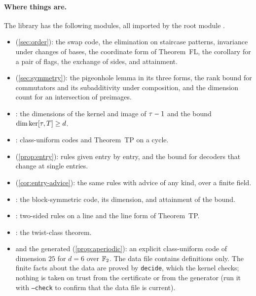 \paragraph{Where things are.} The library  has the following modules, all imported by the
root module .
\begin{itemize}[leftmargin=1.5em]\raggedright
\item {} (\cref{sec:order}): the swap code, the elimination on staircase patterns, invariance under
changes of bases, the coordinate form of Theorem~FL, the corollary for a pair of flags, the exchange of sides, and
attainment.
\item {} (\cref{sec:symmetry}): the pigeonhole lemma in its three forms, the rank bound for
commutators and its subadditivity under composition, and the dimension count for an intersection of preimages.
\item {}: the dimensions of the kernel and image of $\tau-1$ and the bound $\dim\ker[\tau,T]\ge d$.
\item {}: class-uniform codes and Theorem~TP on a cycle.
\item {} (\cref{prop:entry}): rules given entry by entry, and the bound for decoders that change at
single entries.
\item {} (\cref{cor:entry-advice}): the same rules with advice of any kind, over a finite
field.
\item {}: the block-symmetric code, its dimension, and attainment of the bound.
\item {}: two-sided rules on a line and the line form of Theorem~TP.
\item {}: the twist-class theorem.
\item {} and the generated  (\cref{prop:aperiodic}):
an explicit class-uniform code of dimension $25$ for $d=6$ over $\mathbb{F}_2$. The data file contains definitions only. The
finite facts about the data are proved by \texttt{decide}, which the kernel checks; nothing is taken on trust from the
certificate  or from the generator
 (run it with \texttt{--check} to confirm that the data file is current).

\end{itemize}

